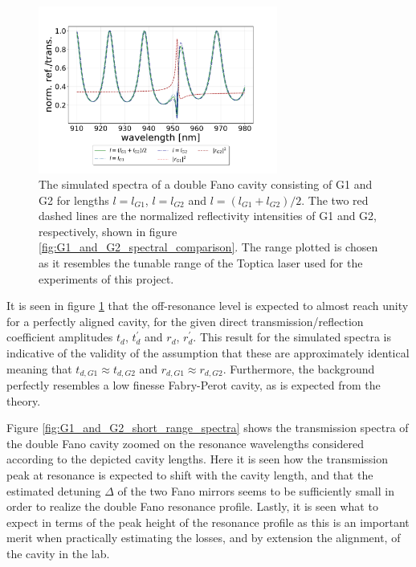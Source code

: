 \begin{figure}[h!]
    \centering
    \includegraphics[width=0.7\textwidth]{figures/results/M3:M5/M3:M5_sim_spectra_long.pdf}
    \caption{The simulated spectra of a double Fano cavity consisting of G1 and G2 for lengths $l=l_{G1}$, $l=l_{G2}$ and $l = (l_{G1}+l_{G2})/2$. The two red dashed lines are the normalized reflectivity intensities of G1 and G2, respectively, shown in figure \ref{fig:G1_and_G2_spectral_comparison}. The range plotted is chosen as it resembles the tunable range of the Toptica laser used for the experiments of this project.}
    \label{fig:G1_and_G2_full_range_spectra}
\end{figure}

It is seen in figure \ref{fig:G1_and_G2_full_range_spectra} that the off-resonance level is expected to almost reach unity for a perfectly aligned cavity, for the given direct transmission/reflection coefficient amplitudes $t_d$, $t_d^{\prime}$ and $r_d$, $r_d^{\prime}$. This result for the simulated spectra is indicative of the validity of the assumption that these are approximately identical meaning that $t_{d,G1} \approx t_{d,G2}$ and $r_{d,G1} \approx r_{d,G2}$. Furthermore, the background perfectly resembles a low finesse Fabry-Perot cavity, as is expected from the theory. 

Figure \ref{fig:G1_and_G2_short_range_spectra} shows the transmission spectra of the double Fano cavity zoomed on the resonance wavelengths considered according to the depicted cavity lengths. Here it is seen how the transmission peak at resonance is expected to shift with the cavity length, and that the estimated detuning $\Delta$ of the two Fano mirrors seems to be sufficiently small in order to realize the double Fano resonance profile. Lastly, it is seen what to expect in terms of the peak height of the resonance profile as this is an important merit when practically estimating the losses, and by extension the alignment, of the cavity in the lab. 

